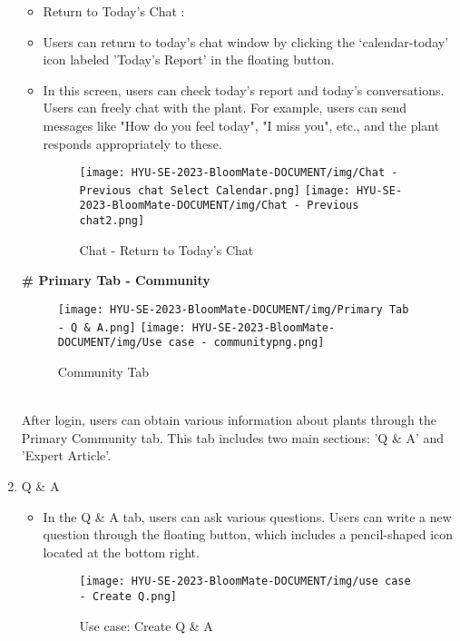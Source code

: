 \documentclass[conference, a4paper]{IEEEtran}
\begin{document}
\begin{enumerate}
\begin{itemize}
        \item Return to Today's Chat : 
        \item[] Users can return to today's chat window by clicking the ‘calendar-today’ icon labeled 'Today's Report' in the floating button. 
        \item[] In this screen, users can check today's report and today's conversations. Users can freely chat with the plant. For example, users can send messages like "How do you feel today", "I miss you", etc., and the plant responds appropriately to these.\\

        \begin{figure}[h]
        \centerline{
            \texttt{[image: HYU-SE-2023-BloomMate-DOCUMENT/img/Chat - Previous chat Select Calendar.png]}
            \texttt{[image: HYU-SE-2023-BloomMate-DOCUMENT/img/Chat - Previous chat2.png]}
        }
        \label{fig}
        \caption{Chat - Return to Today's Chat}
        \end{figure}
    \end{itemize}
\newpage
\newline
\textbf{\# Primary Tab - Community}
    \begin{figure}[h]
    \centerline{
        \texttt{[image: HYU-SE-2023-BloomMate-DOCUMENT/img/Primary Tab - Q \& A.png]}
        \texttt{[image: HYU-SE-2023-BloomMate-DOCUMENT/img/Use case - communitypng.png]}
    }
    \label{fig}
    \caption{Community Tab}
    \end{figure}
\\After login, users can obtain various information about plants through the Primary Community tab. This tab includes two main sections: 'Q \& A' and 'Expert Article'.\\
\item Q \& A
        \begin{itemize}
            \item In the Q \& A tab, users can ask various questions. Users can write a new question through the floating button, which includes a pencil-shaped icon located at the bottom right.
    \begin{figure}[h]
    \centerline{
        \texttt{[image: HYU-SE-2023-BloomMate-DOCUMENT/img/use case - Create Q.png]}
    }
    \label{fig}
    \caption{Use case: Create Q \& A}
    \end{figure}
    

\end{itemize}
\end{enumerate}
\end{document}
